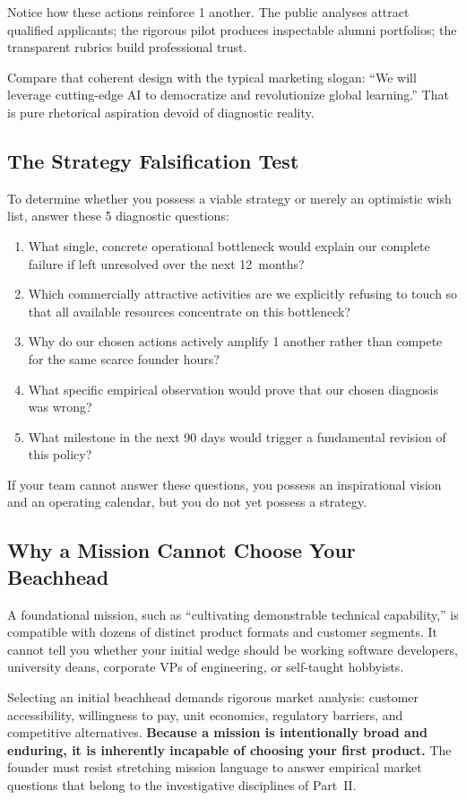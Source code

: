 Notice how these actions reinforce 1 another. The public analyses attract qualified applicants; the rigorous pilot produces inspectable alumni portfolios; the transparent rubrics build professional trust.

Compare that coherent design with the typical marketing slogan: ``We will leverage cutting-edge AI to democratize and revolutionize global learning.'' That is pure rhetorical aspiration devoid of diagnostic reality.

\subsection{The Strategy Falsification Test}

To determine whether you possess a viable strategy or merely an optimistic wish list, answer these 5 diagnostic questions:

\begin{enumerate}[leftmargin=12pt,itemsep=2pt,topsep=1pt,parsep=0pt]
  \item What single, concrete operational bottleneck would explain our complete failure if left unresolved over the next 12~months?
  \item Which commercially attractive activities are we explicitly refusing to touch so that all available resources concentrate on this bottleneck?
  \item Why do our chosen actions actively amplify 1 another rather than compete for the same scarce founder hours?
  \item What specific empirical observation would prove that our chosen diagnosis was wrong?
  \item What milestone in the next 90 days would trigger a fundamental revision of this policy?
\end{enumerate}

If your team cannot answer these questions, you possess an inspirational vision and an operating calendar, but you do not yet possess a strategy.

\subsection{Why a Mission Cannot Choose Your Beachhead}

A foundational mission, such as ``cultivating demonstrable technical capability,'' is compatible with dozens of distinct product formats and customer segments. It cannot tell you whether your initial wedge should be working software developers, university deans, corporate VPs of engineering, or self-taught hobbyists.

Selecting an initial beachhead demands rigorous market analysis: customer accessibility, willingness to pay, unit economics, regulatory barriers, and competitive alternatives. \textbf{Because a mission is intentionally broad and enduring, it is inherently incapable of choosing your first product.} The founder must resist stretching mission language to answer empirical market questions that belong to the investigative disciplines of Part~II.
